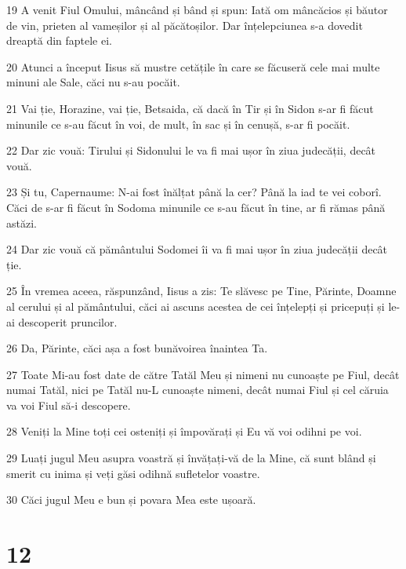 \par 19 A venit Fiul Omului, mâncând și bând și spun: Iată om mâncăcios și băutor de vin, prieten al vameșilor și al păcătoșilor. Dar înțelepciunea s-a dovedit dreaptă din faptele ei.
\par 20 Atunci a început Iisus să mustre cetățile în care se făcuseră cele mai multe minuni ale Sale, căci nu s-au pocăit.
\par 21 Vai ție, Horazine, vai ție, Betsaida, că dacă în Tir și în Sidon s-ar fi făcut minunile ce s-au făcut în voi, de mult, în sac și în cenușă, s-ar fi pocăit.
\par 22 Dar zic vouă: Tirului și Sidonului le va fi mai ușor în ziua judecății, decât vouă.
\par 23 Și tu, Capernaume: N-ai fost înălțat până la cer? Până la iad te vei coborî. Căci de s-ar fi făcut în Sodoma minunile ce s-au făcut în tine, ar fi rămas până astăzi.
\par 24 Dar zic vouă că pământului Sodomei îi va fi mai ușor în ziua judecății decât ție.
\par 25 În vremea aceea, răspunzând, Iisus a zis: Te slăvesc pe Tine, Părinte, Doamne al cerului și al pământului, căci ai ascuns acestea de cei înțelepți și pricepuți și le-ai descoperit pruncilor.
\par 26 Da, Părinte, căci așa a fost bunăvoirea înaintea Ta.
\par 27 Toate Mi-au fost date de către Tatăl Meu și nimeni nu cunoaște pe Fiul, decât numai Tatăl, nici pe Tatăl nu-L cunoaște nimeni, decât numai Fiul și cel căruia va voi Fiul să-i descopere.
\par 28 Veniți la Mine toți cei osteniți și împovărați și Eu vă voi odihni pe voi.
\par 29 Luați jugul Meu asupra voastră și învățați-vă de la Mine, că sunt blând și smerit cu inima și veți găsi odihnă sufletelor voastre.
\par 30 Căci jugul Meu e bun și povara Mea este ușoară.

\chapter{12}

